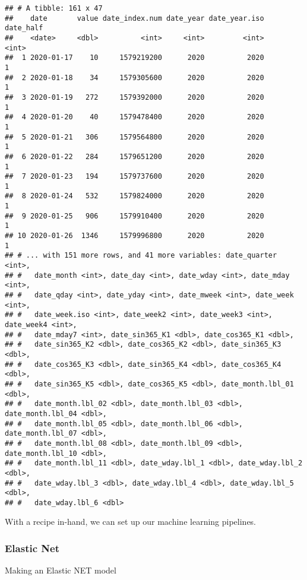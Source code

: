 \documentclass[
]{article}
\newenvironment{Shaded}{\begin{snugshade}}{\end{snugshade}}
\newcommand{\DataTypeTok}[1]{\textcolor[rgb]{0.13,0.29,0.53}{#1}}
\newcommand{\FloatTok}[1]{\textcolor[rgb]{0.00,0.00,0.81}{#1}}
\newcommand{\KeywordTok}[1]{\textcolor[rgb]{0.13,0.29,0.53}{\textbf{#1}}}
\newcommand{\NormalTok}[1]{#1}
\newcommand{\OperatorTok}[1]{\textcolor[rgb]{0.81,0.36,0.00}{\textbf{#1}}}
\newcommand{\StringTok}[1]{\textcolor[rgb]{0.31,0.60,0.02}{#1}}
\begin{document}
\begin{verbatim}
## # A tibble: 161 x 47
##    date       value date_index.num date_year date_year.iso date_half
##    <date>     <dbl>          <int>     <int>         <int>     <int>
##  1 2020-01-17    10     1579219200      2020          2020         1
##  2 2020-01-18    34     1579305600      2020          2020         1
##  3 2020-01-19   272     1579392000      2020          2020         1
##  4 2020-01-20    40     1579478400      2020          2020         1
##  5 2020-01-21   306     1579564800      2020          2020         1
##  6 2020-01-22   284     1579651200      2020          2020         1
##  7 2020-01-23   194     1579737600      2020          2020         1
##  8 2020-01-24   532     1579824000      2020          2020         1
##  9 2020-01-25   906     1579910400      2020          2020         1
## 10 2020-01-26  1346     1579996800      2020          2020         1
## # ... with 151 more rows, and 41 more variables: date_quarter <int>,
## #   date_month <int>, date_day <int>, date_wday <int>, date_mday <int>,
## #   date_qday <int>, date_yday <int>, date_mweek <int>, date_week <int>,
## #   date_week.iso <int>, date_week2 <int>, date_week3 <int>, date_week4 <int>,
## #   date_mday7 <int>, date_sin365_K1 <dbl>, date_cos365_K1 <dbl>,
## #   date_sin365_K2 <dbl>, date_cos365_K2 <dbl>, date_sin365_K3 <dbl>,
## #   date_cos365_K3 <dbl>, date_sin365_K4 <dbl>, date_cos365_K4 <dbl>,
## #   date_sin365_K5 <dbl>, date_cos365_K5 <dbl>, date_month.lbl_01 <dbl>,
## #   date_month.lbl_02 <dbl>, date_month.lbl_03 <dbl>, date_month.lbl_04 <dbl>,
## #   date_month.lbl_05 <dbl>, date_month.lbl_06 <dbl>, date_month.lbl_07 <dbl>,
## #   date_month.lbl_08 <dbl>, date_month.lbl_09 <dbl>, date_month.lbl_10 <dbl>,
## #   date_month.lbl_11 <dbl>, date_wday.lbl_1 <dbl>, date_wday.lbl_2 <dbl>,
## #   date_wday.lbl_3 <dbl>, date_wday.lbl_4 <dbl>, date_wday.lbl_5 <dbl>,
## #   date_wday.lbl_6 <dbl>
\end{verbatim}

With a recipe in-hand, we can set up our machine learning pipelines.

\hypertarget{elastic-net}{%
\subsubsection{Elastic Net}\label{elastic-net}}

Making an Elastic NET model

\begin{Shaded}
\end{Shaded}
\end{document}
